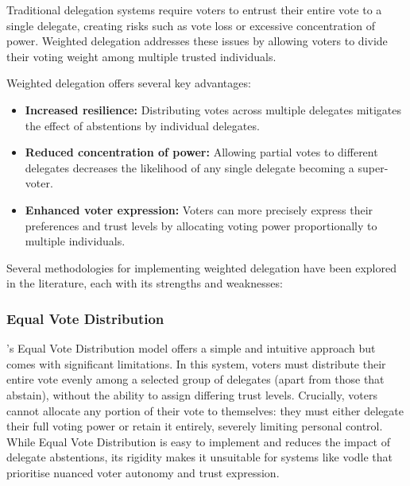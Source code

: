 Traditional delegation systems require voters to entrust their entire vote to a single delegate, creating risks such as vote loss or excessive concentration of power. Weighted delegation addresses these issues by allowing voters to divide their voting weight among multiple trusted individuals.


Weighted delegation offers several key advantages:
\begin{itemize}
  \item \textbf{Increased resilience:} Distributing votes across multiple delegates mitigates the effect of abstentions by individual delegates.
  \item \textbf{Reduced concentration of power:} Allowing partial votes to different delegates decreases the likelihood of any single delegate becoming a super-voter.
  \item \textbf{Enhanced voter expression:} Voters can more precisely express their preferences and trust levels by allocating voting power proportionally to multiple individuals.
\end{itemize}

Several methodologies for implementing weighted delegation have been explored in the literature, each with its strengths and weaknesses:

\subsubsection*{Equal Vote Distribution~\citep{degrave2014}}
\citeauthor{degrave2014}'s Equal Vote Distribution model offers a simple and intuitive approach but comes with significant limitations. In this system, voters must distribute their entire vote evenly among a selected group of delegates (apart from those that abstain), without the ability to assign differing trust levels. Crucially, voters cannot allocate any portion of their vote to themselves: they must either delegate their full voting power or retain it entirely, severely limiting personal control. While Equal Vote Distribution is easy to implement and reduces the impact of delegate abstentions, its rigidity makes it unsuitable for systems like vodle that prioritise nuanced voter autonomy and trust expression.

